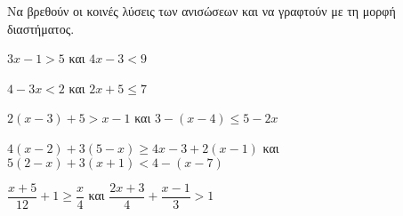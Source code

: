 Να βρεθούν οι κοινές λύσεις των ανισώσεων και να γραφτούν με τη μορφή διαστήματος.
\begin{multicols}{2}
\begin{alist}
\item $ 3x-1>5 $ και $ 4x-3<9 $
\item $ 4-3x<2 $ και $ 2x+5\leq7 $
\item $ 2(x-3)+5>x-1 $ και $ 3-(x-4)\leq5-2x $
\item $ 4(x-2)+3(5-x)\geq4x-3+2(x-1) $ και $ 5(2-x)+3(x+1)<4-(x-7) $
\item $ \dfrac{x+5}{12}+1\geq\dfrac{x}{4} $ και $ \dfrac{2x+3}{4}+\dfrac{x-1}{3}>1 $
\end{alist}
\end{multicols}
